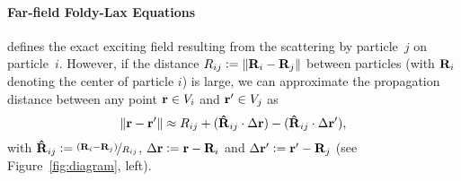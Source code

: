 \paragraph{Far-field Foldy-Lax Equations}
 defines the exact exciting field resulting from the scattering by particle~$j$ on particle~$i$.
However, if the distance $R_{ij} \vcentcolon= \| \mathbf{R}_i - \mathbf{R}_j \|$ between particles (with $\mathbf{R}_i$ denoting the center of particle $i$) is large, we can approximate the propagation distance between any point $\mathbf{r} \in V_i$ and $\mathbf{r}' \in V_j$ as
%
\begin{equation}
    \| \mathbf{r} - \mathbf{r}' \| \approx R_{ij} + (\mathbf{\hat{R}}_{ij} \cdot {\Delta}\mathbf{r}) -  (\mathbf{\hat{R}}_{ij} \cdot {\Delta}\mathbf{r}'),
\end{equation}
%
with $\mathbf{\hat{R}}_{ij} \vcentcolon= \nicefrac{(\mathbf{R}_i - \mathbf{R}_j)}{R_{ij}}$, ${\Delta}\mathbf{r} \vcentcolon= \mathbf{r} - \mathbf{R}_i$ and ${\Delta}\mathbf{r}' \vcentcolon= \mathbf{r}' - \mathbf{R}_j$ (see Figure~\ref{fig:diagram}, left).
%
%
